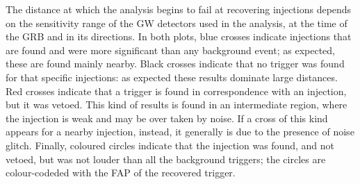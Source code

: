 \documentclass[binding=0.6cm, LaM]{sapthesis}
\begin{document}
	The distance at which the analysis begins to fail at recovering injections 
	depends on the sensitivity range of the GW detectors used in the analysis, 
	at the time of the GRB and in its directions.
	In both plots, blue crosses indicate injections that are found 
	and were more significant than any background event;
	as expected, these are found mainly nearby.
	Black crosses indicate that no trigger was found for that specific injections: 
	as expected these results dominate large distances.
	Red crosses indicate that a trigger is found in correspondence with an injection, 			
	but it was vetoed.
	This kind of results is found in an intermediate region, 
	where the injection is weak and may be over taken by noise.
	If a cross of this kind appears for a nearby injection, instead, 
	it generally is due to the presence of noise glitch. 
	Finally, coloured circles indicate that the injection was found, and not vetoed, 
	but was not louder than all the background triggers;
	the circles are colour-codeded with the FAP of the recovered trigger.
	
\end{document}
